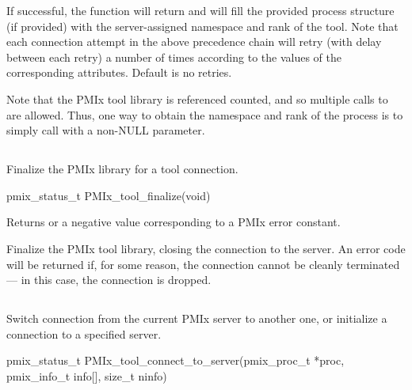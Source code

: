 If successful, the function will return  and will fill the provided process structure (if provided) with the server-assigned namespace and rank of the tool. Note that each connection attempt in the above precedence chain will retry (with delay between each retry) a number of times according to the values of the corresponding attributes. Default is no retries.

Note that the \ac{PMIx} tool library is referenced counted, and so multiple calls to  are allowed.
Thus, one way to obtain the namespace and rank of the process is to simply call  with a non-NULL parameter.


\subsection{}

\summary

Finalize the \ac{PMIx} library for a tool connection.

\format

\cspecificstart
\begin{codepar}
pmix_status_t
PMIx_tool_finalize(void)
\end{codepar}
\cspecificend

Returns  or a negative value corresponding to a PMIx error constant.

\descr

Finalize the PMIx tool library, closing the connection to the server.
An error code will be returned if, for some reason, the connection cannot be cleanly terminated --- in this case, the connection is dropped.


\subsection{}

\summary

Switch connection from the current \ac{PMIx} server to another one, or initialize a connection to a specified server.

\format

\cspecificstart
\begin{codepar}
pmix_status_t
PMIx_tool_connect_to_server(pmix_proc_t *proc,
                            pmix_info_t info[], size_t ninfo)
\end{codepar}
\cspecificend

